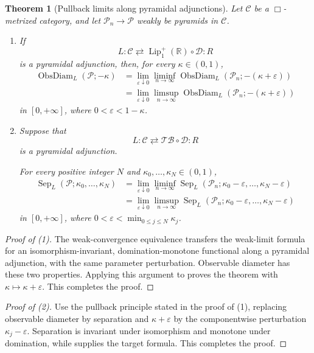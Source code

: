 \documentclass{amsart}
\theoremstyle{plain}
\newtheorem{theorem}{Theorem}[section]
\theoremstyle{definition}
\theoremstyle{remark}
\newcommand{\R}{\mathbb{R}}
\newcommand{\D}{\mathcal{D}}
\newcommand{\TB}{\mathcal{TB}}
\newcommand{\Lup}{\operatorname{Lip}^{+}_{1}(\R)}
\DeclareMathOperator{\od}{ObsDiam}
\begin{document}
\begin{theorem}[Pullback limits along pyramidal adjunctions]
\label{thm:observable-diameter-pyramid-limit}
\label{thm:multi-directed-separation-pyramid-limit}
Let $\mathcal C$ be a $\Box$-metrized category, and let
$\mathcal P_n\to\mathcal P$ weakly be pyramids in $\mathcal C$.
\begin{enumerate}
\item If
\[
L\colon\mathcal C\rightleftarrows\Lup\circ\D\colon R
\]
is a pyramidal adjunction, then, for every $\kappa\in(0,1)$,
\begin{align*}
\od_L(\mathcal P;-\kappa)
&=\lim_{\varepsilon\downarrow0}\liminf_{n\to\infty}
\od_L(\mathcal P_n;-(\kappa+\varepsilon))\\
&=\lim_{\varepsilon\downarrow0}\limsup_{n\to\infty} \od_L(\mathcal P_n;-(\kappa+\varepsilon))
\end{align*}
in $[0,+\infty]$, where $0<\varepsilon<1-\kappa$.
\item Suppose that
\[
L\colon\mathcal C\rightleftarrows\TB\circ\D\colon R
\]
is a pyramidal adjunction.

For every positive integer $N$ and
$\kappa_0,\ldots,\kappa_N\in(0,1)$,
\begin{align*}
\operatorname{Sep}_L(\mathcal P;\kappa_0,\ldots,\kappa_N)
&=\lim_{\varepsilon\downarrow0}\liminf_{n\to\infty}
\operatorname{Sep}_L(\mathcal P_n;\kappa_0-\varepsilon,\ldots,
\kappa_N-\varepsilon)\\
&=\lim_{\varepsilon\downarrow0}\limsup_{n\to\infty}
\operatorname{Sep}_L(\mathcal P_n;\kappa_0-\varepsilon,\ldots,
\kappa_N-\varepsilon)
\end{align*}
in $[0,+\infty]$, where
$0<\varepsilon<\min_{0\leq j\leq N}\kappa_j$.
\end{enumerate}
\end{theorem}

\begin{proof}[Proof of \textup{(1)}]
The weak-convergence equivalence
\cite[Theorem~A.7]{gds3-ja} transfers the weak-limit formula for an
isomorphism-invariant, domination-monotone functional along a pyramidal
adjunction, with the same parameter perturbation.  Observable diameter has
these two properties.  Applying this argument to
 proves the theorem with
$\kappa\mapsto\kappa+\varepsilon$.
	This completes the proof.
\end{proof}

\begin{proof}[Proof of \textup{(2)}]
Use the pullback principle stated in the proof of \textup{(1)}, replacing
observable diameter by separation and $\kappa+\varepsilon$ by the componentwise
perturbation $\kappa_j-\varepsilon$.  Separation is invariant under isomorphism
and monotone under domination, while
 supplies the target
formula.
	This completes the proof.
\end{proof}
\end{document}
